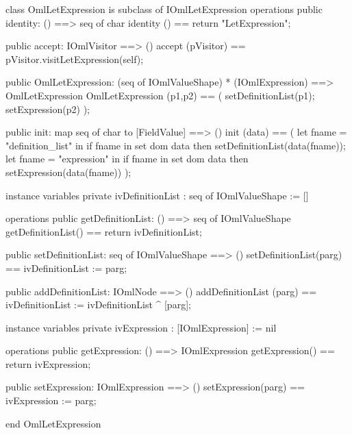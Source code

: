 \begin{vdm_al}
class OmlLetExpression is subclass of IOmlLetExpression
operations
  public identity: () ==> seq of char
  identity () == return "LetExpression";

  public accept: IOmlVisitor ==> ()
  accept (pVisitor) == pVisitor.visitLetExpression(self);

  public OmlLetExpression:
      (seq of IOmlValueShape) *
      (IOmlExpression) ==> OmlLetExpression
  OmlLetExpression (p1,p2) == 
   ( setDefinitionList(p1);
     setExpression(p2) );

  public init: map seq of char to [FieldValue] ==> ()
  init (data) ==
    ( let fname = "definition_list" in
        if fname in set dom data
        then setDefinitionList(data(fname));
      let fname = "expression" in
        if fname in set dom data
        then setExpression(data(fname)) );

instance variables
  private ivDefinitionList : seq of IOmlValueShape := []

operations
  public getDefinitionList: () ==> seq of IOmlValueShape
  getDefinitionList() == return ivDefinitionList;

  public setDefinitionList: seq of IOmlValueShape ==> ()
  setDefinitionList(parg) == ivDefinitionList := parg;

  public addDefinitionList: IOmlNode ==> ()
  addDefinitionList (parg) == ivDefinitionList := ivDefinitionList ^ [parg];

instance variables
  private ivExpression : [IOmlExpression] := nil

operations
  public getExpression: () ==> IOmlExpression
  getExpression() == return ivExpression;

  public setExpression: IOmlExpression ==> ()
  setExpression(parg) == ivExpression := parg;

end OmlLetExpression
\end{vdm_al}

